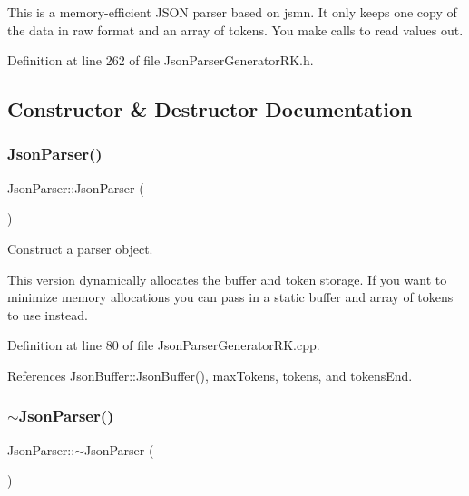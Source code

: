 This is a memory-\/efficient J\+S\+ON parser based on jsmn. It only keeps one copy of the data in raw format and an array of tokens. You make calls to read values out. 

Definition at line 262 of file Json\+Parser\+Generator\+R\+K.\+h.



\subsection{Constructor \& Destructor Documentation}
\mbox{\label{class_json_parser_af21abdfb0ceac731e44d897a0285f5d4}} 
\subsubsection{\texorpdfstring{Json\+Parser()}{JsonParser()}\hspace{0.1cm}{\footnotesize\ttfamily [1/2]}}
{\footnotesize\ttfamily Json\+Parser\+::\+Json\+Parser (\begin{DoxyParamCaption}{ }\end{DoxyParamCaption})}



Construct a parser object. 

This version dynamically allocates the buffer and token storage. If you want to minimize memory allocations you can pass in a static buffer and array of tokens to use instead. 

Definition at line 80 of file Json\+Parser\+Generator\+R\+K.\+cpp.



References Json\+Buffer\+::\+Json\+Buffer(), max\+Tokens, tokens, and tokens\+End.

\mbox{\label{class_json_parser_a7c0393b54c37f9ff30b6bb59f0ba92ce}} 
\subsubsection{\texorpdfstring{$\sim$\+Json\+Parser()}{~JsonParser()}}
{\footnotesize\ttfamily Json\+Parser\+::$\sim$\+Json\+Parser (\begin{DoxyParamCaption}{ }\end{DoxyParamCaption})\hspace{0.3cm}{\ttfamily [virtual]}}



